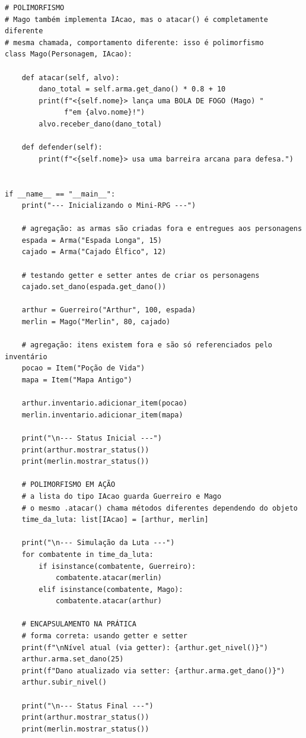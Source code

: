 \begin{lstlisting}[style=python, caption={Exemplo de Aplicação de POO em Python}]
# POLIMORFISMO
# Mago também implementa IAcao, mas o atacar() é completamente diferente
# mesma chamada, comportamento diferente: isso é polimorfismo
class Mago(Personagem, IAcao):

    def atacar(self, alvo):
        dano_total = self.arma.get_dano() * 0.8 + 10
        print(f"<{self.nome}> lança uma BOLA DE FOGO (Mago) "
              f"em {alvo.nome}!")
        alvo.receber_dano(dano_total)

    def defender(self):
        print(f"<{self.nome}> usa uma barreira arcana para defesa.")


if __name__ == "__main__":
    print("--- Inicializando o Mini-RPG ---")

    # agregação: as armas são criadas fora e entregues aos personagens
    espada = Arma("Espada Longa", 15)
    cajado = Arma("Cajado Élfico", 12)

    # testando getter e setter antes de criar os personagens
    cajado.set_dano(espada.get_dano())

    arthur = Guerreiro("Arthur", 100, espada)
    merlin = Mago("Merlin", 80, cajado)

    # agregação: itens existem fora e são só referenciados pelo inventário
    pocao = Item("Poção de Vida")
    mapa = Item("Mapa Antigo")

    arthur.inventario.adicionar_item(pocao)
    merlin.inventario.adicionar_item(mapa)

    print("\n--- Status Inicial ---")
    print(arthur.mostrar_status())
    print(merlin.mostrar_status())

    # POLIMORFISMO EM AÇÃO
    # a lista do tipo IAcao guarda Guerreiro e Mago
    # o mesmo .atacar() chama métodos diferentes dependendo do objeto
    time_da_luta: list[IAcao] = [arthur, merlin]

    print("\n--- Simulação da Luta ---")
    for combatente in time_da_luta:
        if isinstance(combatente, Guerreiro):
            combatente.atacar(merlin)
        elif isinstance(combatente, Mago):
            combatente.atacar(arthur)

    # ENCAPSULAMENTO NA PRÁTICA
    # forma correta: usando getter e setter
    print(f"\nNível atual (via getter): {arthur.get_nivel()}")
    arthur.arma.set_dano(25)
    print(f"Dano atualizado via setter: {arthur.arma.get_dano()}")
    arthur.subir_nivel()

    print("\n--- Status Final ---")
    print(arthur.mostrar_status())
    print(merlin.mostrar_status())
\end{lstlisting}

